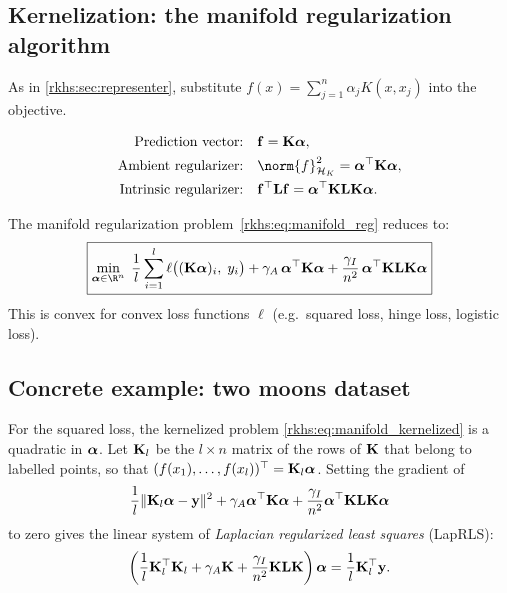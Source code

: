 \begin{notechapter}
\subsection{Kernelization: the manifold regularization algorithm}
\label{rkhs:subsec:manifold_kernelization}

As in \cref{rkhs:sec:representer}, substitute
$f(x) = \sum_{j=1}^n \alpha_j K(x, x_j)$ into the objective.

\begin{align*}
\text{Prediction vector:} &\quad \mat{f} = \mat{K} \vect{\alpha}, \\
\text{Ambient regularizer:} &\quad \norm{f}_{\hk}^2
  = \vect{\alpha}^\top \mat{K} \vect{\alpha}, \\
\text{Intrinsic regularizer:} &\quad \mat{f}^\top \mat{L} \mat{f}
  = \vect{\alpha}^\top \mat{K} \mat{L} \mat{K} \vect{\alpha}.
\end{align*}

\begin{theorem}
\label{rkhs:thm:manifold_kernelized}
The manifold regularization problem~\eqref{rkhs:eq:manifold_reg} reduces to:
\begin{equation}
\label{rkhs:eq:manifold_kernelized}
\boxed{\min_{\vect{\alpha} \in \R^n}\;
\frac{1}{l}\sum_{i=1}^{l} \ell\bigl((\mat{K}\vect{\alpha})_i,\; y_i\bigr)
+ \gamma_A\,\vect{\alpha}^\top\mat{K}\vect{\alpha}
+ \frac{\gamma_I}{n^2}\,\vect{\alpha}^\top \mat{K}\mat{L}\mat{K}\vect{\alpha}}
\end{equation}
This is convex for convex loss functions $\ell$ (e.g.\ squared loss,
hinge loss, logistic loss).
\end{theorem}

\subsection{Concrete example: two moons dataset}
\label{rkhs:subsec:manifold_example}

For the squared loss, the kernelized problem \eqref{rkhs:eq:manifold_kernelized} is a quadratic in $\boldsymbol{\alpha}$. Let $\mathbf{K}_l$ be the $l\times n$ matrix of the rows of $\mathbf{K}$ that belong to labelled points, so that $(f(x_1), \ldots, f(x_l))^\top = \mathbf{K}_l\boldsymbol{\alpha}$. Setting the gradient of
\[
\frac{1}{l} \|\mathbf{K}_l \boldsymbol{\alpha} - \mathbf{y}\|^2
+ \gamma_A \boldsymbol{\alpha}^\top \mathbf{K} \boldsymbol{\alpha}
+ \frac{\gamma_I}{n^2} \boldsymbol{\alpha}^\top \mathbf{K}\mathbf{L}\mathbf{K} \boldsymbol{\alpha}
\]
to zero gives the linear system of \emph{Laplacian regularized least squares} (LapRLS):
\begin{equation}
\left( \frac{1}{l} \mathbf{K}_l^\top \mathbf{K}_l + \gamma_A \mathbf{K}
+ \frac{\gamma_I}{n^2} \mathbf{K}\mathbf{L}\mathbf{K} \right) \boldsymbol{\alpha}
= \frac{1}{l} \mathbf{K}_l^\top \mathbf{y}.
\label{rkhs:eq:laprls}
\end{equation}


\end{notechapter}
